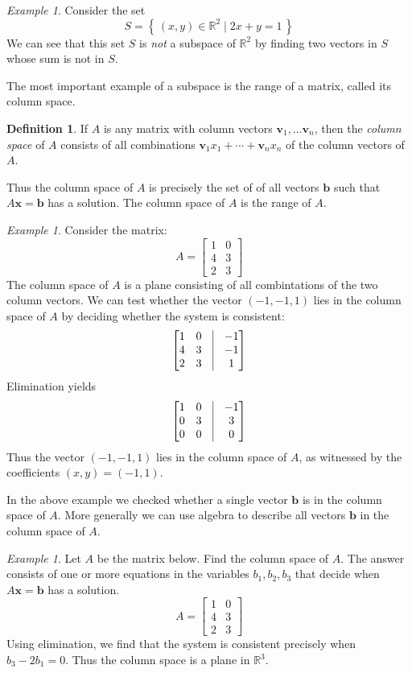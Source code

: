 \documentclass[11pt,oneside]{amsbook}
\newcommand{\set}[1]{\left\{\,#1\,\right\}}
\newcommand{\R}{\mathbb R}
\theoremstyle{definition}
\theoremstyle{plain}
\theoremstyle{definition}
\newtheorem{definition}[theorem]{Definition}
\theoremstyle{remark}
\newtheorem{example}[theorem]{Example}
\numberwithin{equation}{section}
\numberwithin{figure}{section}
\begin{document}
\begin{example}
  Consider the set
  \[S=\set{(x,y)\in\R^2\mid 2x+y=1}
  \]
  We can see that this set $S$ is \emph{not} a subspace of $\R^2$ by finding two vectors in $S$ whose sum is not in $S$.
\end{example}

The most important example of a subspace is the range of a matrix, called its column space.

\begin{definition}
  If $A$ is any matrix with column vectors $\mathbf{v}_1,\ldots\mathbf{v}_n$, then the \emph{column space} of $A$ consists of all combinations $\mathbf{v}_1x_1+\cdots+\mathbf{v}_nx_n$ of the column vectors of $A$.
\end{definition}

Thus the column space of $A$ is precisely the set of of all vectors $\mathbf{b}$ such that $A\mathbf{x}=\mathbf{b}$ has a solution. The column space of $A$ is the range of $A$.

\begin{example}
  Consider the matrix:
  \[A=\begin{bmatrix}1&0\\4&3\\2&3\end{bmatrix}
  \]
  The column space of $A$ is a plane consisting of all combintations of the two column vectors. We can test whether the vector $(-1,-1,1)$ lies in the column space of $A$ by deciding whether the system is consistent:
  \[\begin{bmatrix}1&0&\vline&-1\\4&3&\vline&-1\\2&3&\vline&1\end{bmatrix}
  \]
  Elimination yields
  \[\begin{bmatrix}1&0&\vline&-1\\0&3&\vline&3\\0&0&\vline&0\end{bmatrix}
  \]  
  Thus the vector $(-1,-1,1)$ lies in the column space of $A$, as witnessed by the coefficients $(x,y)=(-1,1)$.
\end{example}

In the above example we checked whether a single vector $\mathbf{b}$ is in the column space of $A$. More generally we can use algebra to describe all vectors $\mathbf{b}$ in the column space of $A$.

\begin{example}
  Let $A$ be the matrix below. Find the column space of $A$. The answer consists of one or more equations in the variables $b_1,b_2,b_3$ that decide when $A\mathbf{x}=\mathbf{b}$ has a solution.
  \[A=\begin{bmatrix}
      1&0\\
      4&3\\
      2&3
    \end{bmatrix}
  \]
  Using elimination, we find that the system is consistent precisely when $b_3-2b_1=0$. Thus the column space is a plane in $\R^3$.
\end{example}
\end{document}
